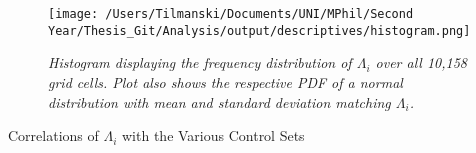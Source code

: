 \documentclass[11pt, oneside]{article}   	%
\newcommand{\mysubcaption}[1]{
\justify
\begin{spacing}{0.7}
\textit{\footnotesize #1}
\end{spacing}}
\begin{document}
\begin{spacing}{1.3}
\begin{figure}[!h]
  \texttt{[image: /Users/Tilmanski/Documents/UNI/MPhil/Second Year/Thesis\_Git/Analysis/output/descriptives/histogram.png]}
  \label{fig:APP:histogram_lambda}

  \mysubcaption{Histogram displaying the frequency distribution of $\Lambda_{i}$ over all 10,158 grid cells. Plot also shows the respective PDF of a normal distribution with mean and standard deviation matching $\Lambda_{i}$.}
  \end{figure}

    \begin{table}[h] \centering
      \caption{Correlations of $\Lambda_{i}$ with the Various Control Sets}
      \label{tab:APP:basic_corrs}
      \resizebox{!}{0.48\textheight}{


}
\end{table}
\end{spacing}
\end{document}
